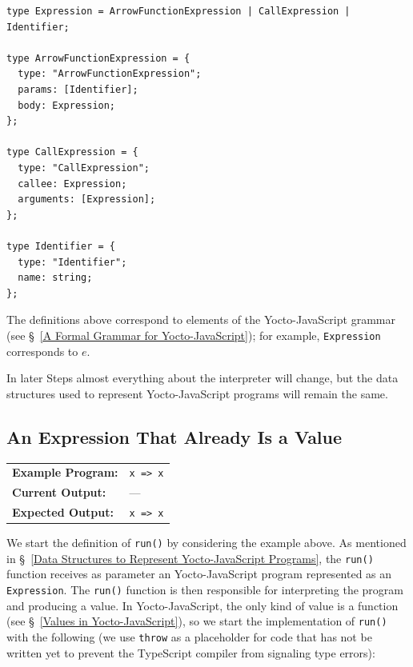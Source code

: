 \documentclass[12pt, oneside]{book}
\begin{document}
\begin{verbatim}
type Expression = ArrowFunctionExpression | CallExpression | Identifier;

type ArrowFunctionExpression = {
  type: "ArrowFunctionExpression";
  params: [Identifier];
  body: Expression;
};

type CallExpression = {
  type: "CallExpression";
  callee: Expression;
  arguments: [Expression];
};

type Identifier = {
  type: "Identifier";
  name: string;
};
\end{verbatim}

\begin{mdframed}[frametitle = {Advanced}]
The definitions above correspond to elements of the Yocto-JavaScript grammar (see §~\ref{A Formal Grammar for Yocto-JavaScript}); for example, \texttt{Expression} corresponds to $e$.
\end{mdframed}

In later Steps almost everything about the interpreter will change, but the data structures used to represent Yocto-JavaScript programs will remain the same.

\subsection{An Expression That Already Is a Value}
\label{An Expression That Already Is a Value}

\begin{center}
\begin{tabular}{ll}
\textbf{Example Program:} & \texttt{x => x} \\
\textbf{Current Output:} & — \\
\textbf{Expected Output:} & \texttt{x => x} \\
\end{tabular}
\end{center}

We start the definition of \texttt{run()} by considering the example above. As mentioned in §~\ref{Data Structures to Represent Yocto-JavaScript Programs}, the \texttt{run()} function receives as parameter an Yocto-JavaScript program represented as an \texttt{Expression}. The \texttt{run()} function is then responsible for interpreting the program and producing a value. In Yocto-JavaScript, the only kind of value is a function (see §~\ref{Values in Yocto-JavaScript}), so we start the implementation of \texttt{run()} with the following (we use \texttt{throw} as a placeholder for code that has not be written yet to prevent the TypeScript compiler from signaling type errors):
\end{document}
